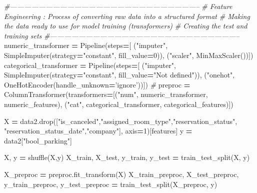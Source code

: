 \documentclass[10pt,a4paper]{article}
\newenvironment{Shaded}{\begin{snugshade}}{\end{snugshade}}
\newcommand{\CommentTok}[1]{\textcolor[rgb]{0.56,0.35,0.01}{\textit{#1}}}
\newcommand{\DecValTok}[1]{\textcolor[rgb]{0.00,0.00,0.81}{#1}}
\newcommand{\NormalTok}[1]{#1}
\newcommand{\OperatorTok}[1]{\textcolor[rgb]{0.81,0.36,0.00}{\textbf{#1}}}
\newcommand{\StringTok}[1]{\textcolor[rgb]{0.31,0.60,0.02}{#1}}
\theoremstyle{break}
\begin{document}
\begin{Shaded}
\begin{Highlighting}[]
\CommentTok{#--------------------------------------------------------------------------------}
\CommentTok{# Feature Engineering : Process of converting raw data into a structured format }
\CommentTok{# Making the data ready to use for model training (transformers)}
\CommentTok{# Creating the test and training sets}
\CommentTok{#--------------------------------------------------------------------------------}
\NormalTok{numeric_transformer }\OperatorTok{=}\NormalTok{ Pipeline(steps}\OperatorTok{=}\NormalTok{[}
\NormalTok{                                    (}\StringTok{"imputer"}\NormalTok{, SimpleImputer(strategy}\OperatorTok{=}\StringTok{"constant"}\NormalTok{, fill_value}\OperatorTok{=}\DecValTok{0}\NormalTok{)),}
\NormalTok{                                    (}\StringTok{"scaler"}\NormalTok{, MinMaxScaler())]) }
\NormalTok{categorical_transformer }\OperatorTok{=}\NormalTok{ Pipeline(steps}\OperatorTok{=}\NormalTok{[}
\NormalTok{                                    (}\StringTok{"imputer"}\NormalTok{, SimpleImputer(strategy}\OperatorTok{=}\StringTok{"constant"}\NormalTok{,}
\NormalTok{                                    fill_value}\OperatorTok{=}\StringTok{"Not defined"}\NormalTok{)),}
\NormalTok{                                    (}\StringTok{"onehot"}\NormalTok{, OneHotEncoder(handle_unknown}\OperatorTok{=}\StringTok{'ignore'}\NormalTok{))]) }\CommentTok{#}
\NormalTok{preproc }\OperatorTok{=}\NormalTok{ ColumnTransformer(transformers}\OperatorTok{=}\NormalTok{[(}\StringTok{"num"}\NormalTok{, numeric_transformer, numeric_features),}
\NormalTok{                                          (}\StringTok{"cat"}\NormalTok{, categorical_transformer, categorical_features)])}

\NormalTok{X }\OperatorTok{=}\NormalTok{ data2.drop([}\StringTok{"is_canceled"}\NormalTok{,}\StringTok{"assigned_room_type"}\NormalTok{,}\StringTok{"reservation_status"}\NormalTok{,}
\StringTok{"reservation_status_date"}\NormalTok{,}\StringTok{"company"}\NormalTok{],}
\NormalTok{              axis}\OperatorTok{=}\DecValTok{1}\NormalTok{)[features]}
\NormalTok{y }\OperatorTok{=}\NormalTok{ data2[}\StringTok{"bool_parking"}\NormalTok{]}

\NormalTok{X, y }\OperatorTok{=}\NormalTok{ shuffle(X,y)}
\NormalTok{X_train, X_test, y_train, y_test }\OperatorTok{=}\NormalTok{ train_test_split(X, y)}

\NormalTok{X_preproc }\OperatorTok{=}\NormalTok{ preproc.fit_transform(X)}
\NormalTok{X_train_preproc, X_test_preproc, y_train_preproc, y_test_preproc }\OperatorTok{=}\NormalTok{ train_test_split(X_preproc, y)}
\end{Highlighting}
\end{Shaded}
\end{document}
